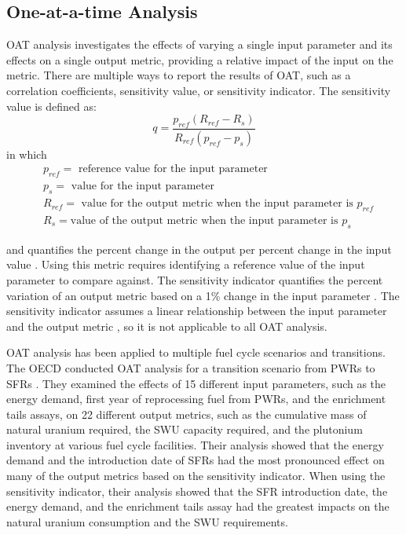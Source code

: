 \subsection{One-at-a-time Analysis}
\gls{OAT} analysis 
investigates the effects of varying a single input parameter and its effects
on a single output metric, providing a relative impact of the input on the 
metric. There are multiple ways to report the results of \gls{OAT}, such as a 
correlation coefficients, sensitivity value, or sensitivity indicator. 
The sensitivity value is defined as:
\begin{equation}
    q = \frac{p_{ref}(R_{ref}-R_s)}{R_{ref}(p_{ref}-p_s)}
    \label{eq:sensitivity_metric}
\end{equation}
in which 
\begin{align*}
    &p_{ref} = \text{ reference value for the input parameter}\\
    &p_s = \text{ value for the input parameter}\\
    &R_{ref} = \text{ value for the output metric when the input parameter is }p_{ref}\\
    &R_s = \text{value of the output metric when the input parameter is }p_s
\end{align*}

\noindent and quantifies the percent change in the output 
per percent change in the input value \cite{noauthor_effects_2017}. 
Using this metric requires identifying a reference value of the input 
parameter to compare against.
The sensitivity indicator  
quantifies the percent variation of an output metric based on a 1\% change in 
the input parameter \cite{noauthor_effects_2017}. The sensitivity indicator 
assumes a linear relationship between the input parameter and the output metric 
\cite{noauthor_effects_2017}, so it is not applicable to all \gls{OAT} 
analysis. 

\gls{OAT} analysis has been applied to multiple fuel cycle scenarios and 
transitions. The \gls{OECD} conducted \gls{OAT} analysis for a transition scenario 
from \glspl{PWR} to \glspl{SFR} \cite{noauthor_effects_2017}. They examined 
the effects of 15 different 
input parameters, such as the energy demand, first year of reprocessing fuel 
from \glspl{PWR}, and the enrichment tails assays, on 22 different output metrics, 
such as the cumulative mass of natural uranium required, the \gls{SWU} capacity 
required, and the plutonium inventory at various fuel cycle facilities. 
Their analysis showed that the energy demand and the introduction date of 
\glspl{SFR} had the most pronounced effect on many of the output metrics 
based on the 
sensitivity indicator. When using the sensitivity indicator, their analysis 
showed that the \gls{SFR} introduction date, the energy demand, and the 
enrichment tails assay had the greatest impacts on the natural uranium 
consumption and the \gls{SWU} requirements. 

